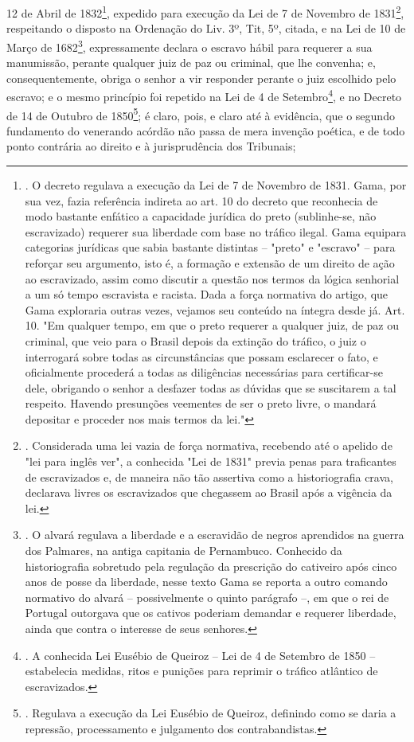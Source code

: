 12 de Abril de 1832\footnote{. O decreto regulava a execução da Lei de 7
  de Novembro de 1831. Gama, por sua vez, fazia referência indireta ao
  art. 10 do decreto que reconhecia de modo bastante enfático a
  capacidade jurídica do preto (sublinhe-se, não escravizado) requerer
  sua liberdade com base no tráfico ilegal. Gama equipara categorias
  jurídicas que sabia bastante distintas -- "preto" e "escravo" -- para
  reforçar seu argumento, isto é, a formação e extensão de um direito de
  ação ao escravizado, assim como discutir a questão nos termos da
  lógica senhorial a um só tempo escravista e racista. Dada a força
  normativa do artigo, que Gama exploraria outras vezes, vejamos seu
  conteúdo na íntegra desde já. Art. 10. "Em qualquer tempo, em que o
  preto requerer a qualquer juiz, de paz ou criminal, que veio para o
  Brasil depois da extinção do tráfico, o juiz o interrogará sobre todas
  as circunstâncias que possam esclarecer o fato, e oficialmente
  procederá a todas as diligências necessárias para certificar-se dele,
  obrigando o senhor a desfazer todas as dúvidas que se suscitarem a tal
  respeito. Havendo presunções veementes de ser o preto livre, o mandará
  depositar e proceder nos mais termos da lei."}, expedido para execução
da Lei de 7 de Novembro de 1831\footnote{. Considerada uma lei vazia de
  força normativa, recebendo até o apelido de "lei para inglês ver", a
  conhecida "Lei de 1831" previa penas para traficantes de escravizados
  e, de maneira não tão assertiva como a historiografia crava, declarava
  livres os escravizados que chegassem ao Brasil após a vigência da lei.},
respeitando o disposto na Ordenação do Liv. 3º, Tit, 5º, citada, e na
Lei de 10 de Março de 1682\footnote{. O alvará regulava a liberdade e a
  escravidão de negros aprendidos na guerra dos Palmares, na antiga
  capitania de Pernambuco. Conhecido da historiografia sobretudo pela
  regulação da prescrição do cativeiro após cinco anos de posse da
  liberdade, nesse texto Gama se reporta a outro comando normativo do
  alvará -- possivelmente o quinto parágrafo --, em que o rei de
  Portugal outorgava que os cativos poderiam demandar e requerer
  liberdade, ainda que contra o interesse de seus senhores.},
expressamente declara o escravo hábil para requerer a sua manumissão,
perante qualquer juiz de paz ou criminal, que lhe convenha; e,
consequentemente, obriga o senhor a vir responder perante o juiz
escolhido pelo escravo; e o mesmo princípio foi repetido na Lei de 4 de
Setembro\footnote{. A conhecida Lei Eusébio de Queiroz -- Lei de 4 de
  Setembro de 1850 -- estabelecia medidas, ritos e punições para
  reprimir o tráfico atlântico de escravizados.}, e no Decreto de 14 de
Outubro de 1850\footnote{. Regulava a execução da Lei Eusébio de
  Queiroz, definindo como se daria a repressão, processamento e
  julgamento dos contrabandistas.}; é claro, pois, e claro até à
evidência, que o segundo fundamento do venerando acórdão não passa de
mera invenção poética, e de todo ponto contrária ao direito e à
jurisprudência dos Tribunais;

